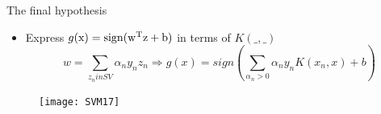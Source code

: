 \begin{frame}{The final hypothesis}
\begin{itemize}
\item Express $g(\rm x)=sign({\rm w}^T{\rm z}+b)$ in terms of $K(\_,\_)$
\[w = \sum\limits_{{z_n}inSV} {{\alpha _n}{y_n}{z_n} \Rightarrow g(x) = sign\left( {\sum\limits_{{\alpha _n} > 0} {{\alpha _n}{y_n}K({x_n},x)}  + b} \right)} \]
\end{itemize}
\begin{figure}
\texttt{[image: SVM17]}
\end{figure}
\end{frame}


%

